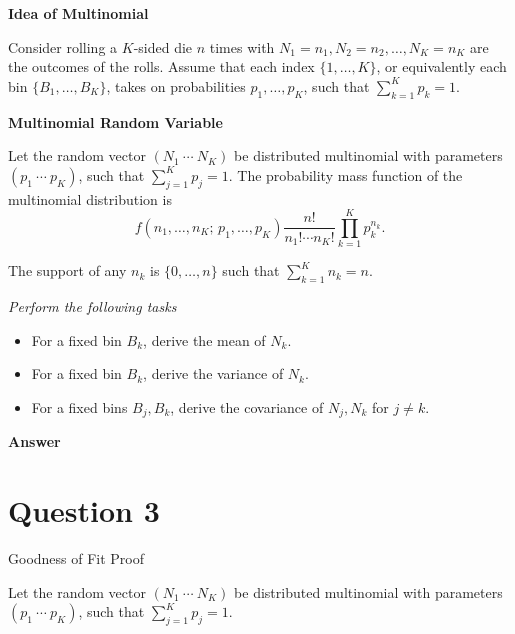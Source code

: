 \documentclass[letterpaper]{article}
\begin{document}
	\textbf{Idea of Multinomial}
	
	Consider rolling a $K$-sided die $n$ times with $N_1 = n_1, N_2 = n_2, \ldots, N_K = n_K$ are the outcomes of the rolls. Assume that each index $\{1, \ldots, K\}$, or equivalently each bin $\{B_1, \ldots, B_K\}$, takes on probabilities $p_1, \ldots, p_K$, such that $\sum_{k=1}^{K} p_k = 1$.
	
	
	\textbf{Multinomial Random Variable}
	
	Let the random vector $(N_1 \ \cdots \ N_K)$ be distributed multinomial with parameters $(p_1 \ \cdots \ p_K)$, such that $\sum_{j=1}^{K} p_j = 1$. The probability mass function of the multinomial distribution is
	\[
	f(n_1, \ldots, n_K;\, p_1, \ldots, p_K) \frac{n!}{n_1! \cdots n_K!} \prod_{k=1}^{K} p_k^{n_k}.
	\]
	
	The support of any $n_k$ is $\{0, \ldots, n\}$ such that $\sum_{k=1}^{K} n_k = n$.
	
	\bigskip
	
	\emph{Perform the following tasks}
	\begin{itemize}
		\item[(i)] For a fixed bin $B_k$, derive the mean of $N_k$.
		\item[(ii)] For a fixed bin $B_k$, derive the variance of $N_k$.
		\item[(iii)] For a fixed bins $B_j, B_k$, derive the covariance of $N_j, N_k$ for $j \neq k$.
	\end{itemize}
	
	\textbf{Answer}
	
	\clearpage
	
	\section{Question 3}
	
	{\color{deepred}  Goodness of Fit Proof}
	
	Let the random vector $(N_1 \ \cdots \ N_K)$ be distributed multinomial with parameters $(p_1 \ \cdots \ p_K)$, such that $\sum_{j=1}^{K} p_j = 1$.
	
\end{document}

